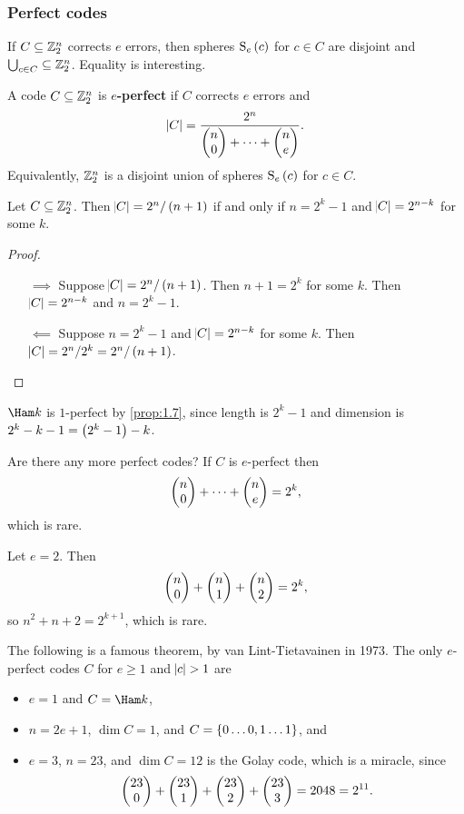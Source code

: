 \subsubsection{Perfect codes}

If $ C \subseteq \mathbb{Z}_2^n $ corrects $ e $ errors, then spheres $ \S_e\br{c} $ for $ c \in C $ are disjoint and $ \bigcup_{c \in C} \subseteq \mathbb{Z}_2^n $. Equality is interesting.

\begin{definition*}
A code $ C \subseteq \mathbb{Z}_2^n $ is \textbf{$ e $-perfect} if $ C $ corrects $ e $ errors and
$$ \abs{C} = \dfrac{2^n}{\begin{pmatrix} n \\ 0 \end{pmatrix} + \dots + \begin{pmatrix} n \\ e \end{pmatrix}}. $$
Equivalently, $ \mathbb{Z}_2^n $ is a disjoint union of spheres $ \S_e\br{c} $ for $ c \in C $.
\end{definition*}

\begin{proposition}
Let $ C \subseteq \mathbb{Z}_2^n $. Then $ \abs{C} = 2^n / \br{n + 1} $ if and only if $ n = 2^k - 1 $ and $ \abs{C} = 2^{n - k} $ for some $ k $.
\end{proposition}

\begin{proof}
\hfill
\begin{itemize}
\item[$ \implies $] Suppose $ \abs{C} = 2^n / \br{n + 1} $. Then $ n + 1 = 2^k $ for some $ k $. Then $ \abs{C} = 2^{n - k} $ and $ n = 2^k - 1 $.
\item[$ \impliedby $] Suppose $ n = 2^k - 1 $ and $ \abs{C} = 2^{n - k} $ for some $ k $. Then $ \abs{C} = 2^n / 2^k = 2^n / \br{n + 1} $.
\end{itemize}
\end{proof}

\begin{example*}
$ \Ham k $ is $ 1 $-perfect by \ref{prop:1.7}, since length is $ 2^k - 1 $ and dimension is $ 2^k - k - 1 = \br{2^k - 1} - k $.
\end{example*}

Are there any more perfect codes? If $ C $ is $ e $-perfect then
$$ \begin{pmatrix} n \\ 0 \end{pmatrix} + \dots + \begin{pmatrix} n \\ e \end{pmatrix} = 2^k, $$
which is rare.

\begin{example*}
Let $ e = 2 $. Then
$$ \begin{pmatrix} n \\ 0 \end{pmatrix} + \begin{pmatrix} n \\ 1 \end{pmatrix} + \begin{pmatrix} n \\ 2 \end{pmatrix} = 2^k, $$
so $ n^2 + n + 2 = 2^{k + 1} $, which is rare.
\end{example*}

The following is a famous theorem, by van Lint-Tietavainen in 1973. The only $ e $-perfect codes $ C $ for $ e \ge 1 $ and $ \abs{c} > 1 $ are
\begin{itemize}
\item $ e = 1 $ and $ C = \Ham k $,
\item $ n = 2e + 1 $, $ \dim C = 1 $, and $ C = \cbr{0 \dots 0, 1 \dots 1} $, and
\item $ e = 3 $, $ n = 23 $, and $ \dim C = 12 $ is the Golay code, which is a miracle, since
$$ \begin{pmatrix} 23 \\ 0 \end{pmatrix} + \begin{pmatrix} 23 \\ 1 \end{pmatrix} + \begin{pmatrix} 23 \\ 2 \end{pmatrix} + \begin{pmatrix} 23 \\ 3 \end{pmatrix} = 2048 = 2^{11}. $$
\end{itemize}

